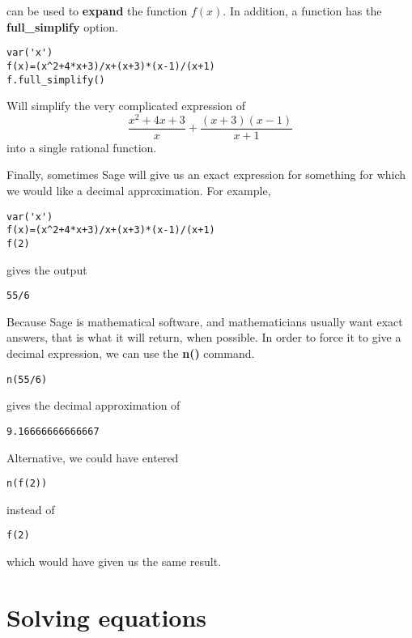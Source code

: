 \documentclass[12pt]{amsart}
\theoremstyle{definition}
\theoremstyle{definition}
\begin{document}
can be used to \textbf{expand} the function $f(x)$. In addition,
a function has the \textbf{full\_simplify} option.

\begin{verbatim}
var('x')
f(x)=(x^2+4*x+3)/x+(x+3)*(x-1)/(x+1)
f.full_simplify()
\end{verbatim}

Will simplify the very complicated expression of
\begin{equation*}
	\frac{x^2+4x+3}{x} + \frac{(x+3)(x-1)}{x+1}
\end{equation*}
into a single rational function.

Finally, sometimes Sage will give us an exact expression for
something for which we would like a decimal approximation.
For example, 

\begin{verbatim}
var('x')
f(x)=(x^2+4*x+3)/x+(x+3)*(x-1)/(x+1)
f(2)
\end{verbatim}

gives the output

\begin{verbatim}
55/6
\end{verbatim}

Because Sage is mathematical software, and mathematicians usually
want exact answers, that is what it will return, when possible. In order
to force it to give a decimal expression, we can use the
\textbf{n()} command.

\begin{verbatim}
n(55/6)
\end{verbatim}

gives the decimal approximation of

\begin{verbatim}
9.16666666666667
\end{verbatim}

Alternative, we could have entered

\begin{verbatim}
n(f(2))
\end{verbatim}

instead of 

\begin{verbatim}
f(2)
\end{verbatim}

which would have given us the same result.

\section{Solving equations}
\end{document}

